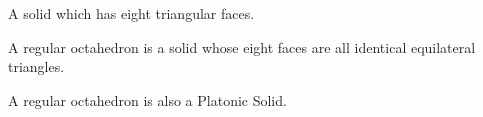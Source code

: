 A solid which has eight triangular faces.  
\par
A regular octahedron is a solid whose eight faces are all identical 
equilateral triangles.
\par
A regular octahedron is also a Platonic Solid.